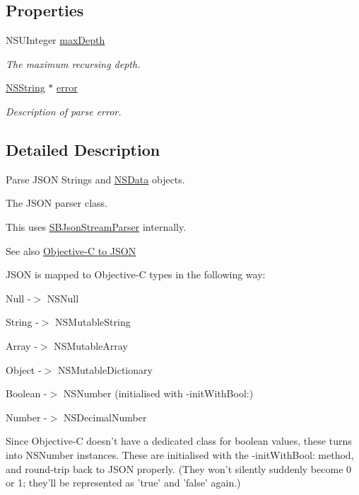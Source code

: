 \subsection*{\-Properties}
\begin{DoxyCompactItemize}
\item 
\-N\-S\-U\-Integer \hyperlink{interface_s_b_json_parser_a0378b4ce99a1caeddc4a05da37ca4ffa}{max\-Depth}
\begin{DoxyCompactList}\small\item\em \-The maximum recursing depth. \end{DoxyCompactList}\item 
\hyperlink{class_n_s_string}{\-N\-S\-String} $\ast$ \hyperlink{interface_s_b_json_parser_ab9b74d7c752a03042edb78beeafaa6ce}{error}
\begin{DoxyCompactList}\small\item\em \-Description of parse error. \end{DoxyCompactList}\end{DoxyCompactItemize}


\subsection{\-Detailed \-Description}
\-Parse \-J\-S\-O\-N \-Strings and \hyperlink{class_n_s_data}{\-N\-S\-Data} objects. 

\-The \-J\-S\-O\-N parser class.

\-This uses \hyperlink{interface_s_b_json_stream_parser}{\-S\-B\-Json\-Stream\-Parser} internally.

\begin{DoxySeeAlso}{\-See also}
\hyperlink{objc2json}{\-Objective-\/\-C to \-J\-S\-O\-N}
\end{DoxySeeAlso}
\-J\-S\-O\-N is mapped to \-Objective-\/\-C types in the following way\-:

\begin{DoxyItemize}
\item \-Null -\/$>$ \-N\-S\-Null \item \-String -\/$>$ \-N\-S\-Mutable\-String \item \-Array -\/$>$ \-N\-S\-Mutable\-Array \item \-Object -\/$>$ \-N\-S\-Mutable\-Dictionary \item \-Boolean -\/$>$ \-N\-S\-Number (initialised with -\/init\-With\-Bool\-:) \item \-Number -\/$>$ \-N\-S\-Decimal\-Number\end{DoxyItemize}
\-Since \-Objective-\/\-C doesn't have a dedicated class for boolean values, these turns into \-N\-S\-Number instances. \-These are initialised with the -\/init\-With\-Bool\-: method, and round-\/trip back to \-J\-S\-O\-N properly. (\-They won't silently suddenly become 0 or 1; they'll be represented as 'true' and 'false' again.)

